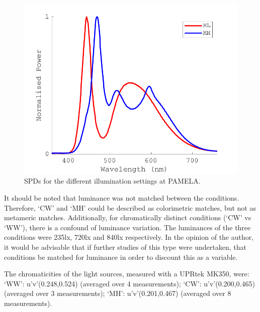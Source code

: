 \begin{figure}[hbtp] %
\includegraphics[max width=\textwidth]{figs/tablet/PAMELA_SPD2.pdf}
\caption{\gls{SPD}s for the different illumination settings at \gls{PAMELA}.}
\label{fig:PAMELAlights5}
\end{figure}

It should be noted that luminance was not matched between the conditions. Therefore, `CW' and `MH' could be described as colorimetric matches, but not as metameric matches. Additionally, for chromatically distinct conditions (`CW' vs `WW'), there is a confound of luminance variation. The luminances of the three conditions were 235lx, 720lx and 840lx respectively. In the opinion of the author, it would be advisable that if further studies of this type were undertaken, that conditions be matched for luminance in order to discount this as a variable. 

The chromaticities of the light sources, measured with a UPRtek MK350, were:
`WW': 	u'v'(0.248,0.524) (averaged over 4 measurements);
`CW': 	u'v'(0.200,0.465) (averaged over 3 measurements);
`MH': 	u'v'(0.201,0.467) (averaged over 8 measurements).

